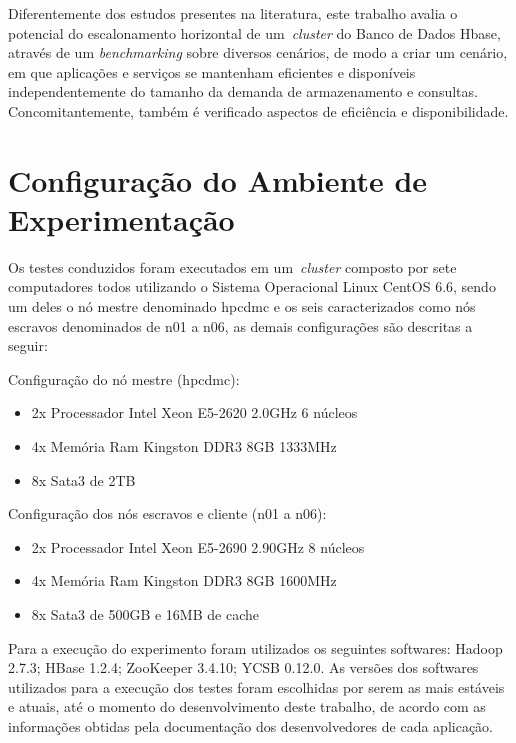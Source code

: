 \documentclass[12pt]{article}
\begin{document}
Diferentemente dos estudos presentes na literatura, este trabalho avalia o potencial do escalonamento horizontal de um~\emph{cluster} do Banco de Dados Hbase, através de um \textit{benchmarking} sobre diversos cenários, de modo a criar um cenário, em que aplicações e serviços se mantenham eficientes e disponíveis independentemente do tamanho da demanda de armazenamento e consultas. Concomitantemente, também é verificado aspectos de eficiência e disponibilidade.

\section{Configuração do Ambiente de Experimentação}
\label{sec:conf-experimento}

Os testes conduzidos foram executados em um~\emph{cluster} composto por sete computadores todos utilizando o Sistema Operacional Linux CentOS 6.6, sendo um deles o nó mestre denominado hpcdmc e os seis caracterizados como nós escravos denominados de n01 a n06, as demais configurações são descritas a seguir:

Configuração do nó mestre (hpcdmc):
\begin{itemize}
\item 2x Processador Intel Xeon E5-2620 2.0GHz 6 núcleos
\item 4x Memória Ram Kingston DDR3 8GB 1333MHz
\item 8x Sata3 de 2TB
\end{itemize}

Configuração dos nós escravos e cliente (n01 a n06):

\begin{itemize}
\item 2x Processador Intel Xeon E5-2690 2.90GHz 8 núcleos
\item 4x Memória Ram Kingston DDR3 8GB 1600MHz
\item 8x Sata3 de 500GB e 16MB de cache
\end{itemize}

Para a execução do experimento foram utilizados os seguintes softwares: Hadoop 2.7.3; HBase 1.2.4; ZooKeeper 3.4.10; YCSB 0.12.0. As versões dos softwares utilizados para a execução dos testes foram escolhidas por serem as mais estáveis e atuais, até o momento do desenvolvimento deste trabalho, de acordo com as informações obtidas pela documentação dos desenvolvedores de cada aplicação.
\end{document}
